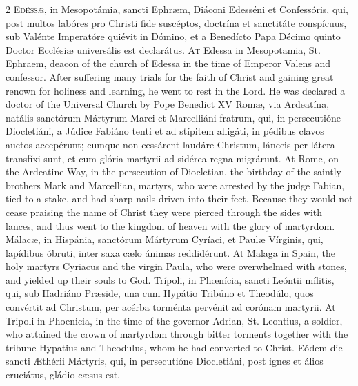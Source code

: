 \begin{paracol}{2}
\lettrine[lines=2]{E}{déssæ,} in Mesopotámia, sancti Ephræm, Diáconi Edesséni et Confessóris, qui, post multos labóres pro 
 Christi fide suscéptos, doctrína et sanctitáte conspícuus, sub Valénte 
 Imperatóre quiévit in Dómino, et a Benedícto Papa Décimo quinto Doctor 
 Ecclésiæ universális est declarátus.
\switchcolumn
{}
\lettrine[lines=2]{A}{t} Edessa in Mesopotamia, St. 
 Ephraem, deacon of the church of Edessa in the time of Emperor Valens and 
 confessor. After suffering many trials for the faith of Christ and 
 gaining great renown for holiness and learning, he went to rest in the Lord. 
 He was declared a doctor of the Universal Church by Pope Benedict XV
\switchcolumn*
{}
Romæ, via Ardeatína, 
 natális sanctórum Mártyrum Marci et Marcelliáni fratrum, qui, in 
 persecutióne Diocletiáni, a Júdice Fabiáno tenti et ad stípitem alligáti, in 
 pédibus clavos auctos accepérunt; cumque non cessárent laudáre Christum, 
 lánceis per látera transfíxi sunt, et cum glória martyrii ad sidérea regna 
 migrárunt.
\switchcolumn
{}
At Rome, on the Ardeatine Way, in 
 the persecution of Diocletian, the birthday of the saintly brothers Mark and 
 Marcellian, martyrs, who were arrested by the judge Fabian, tied to a stake, 
 and had sharp nails driven into their feet. Because they would not 
 cease praising the name of Christ they were pierced through the sides with 
 lances, and thus went to the kingdom of heaven with the glory of martyrdom.
\switchcolumn*
{}
Málacæ, in Hispánia, 
 sanctórum Mártyrum Cyríaci, et Paulæ Vírginis, qui, lapídibus óbruti, inter 
 saxa cælo ánimas reddidérunt.
\switchcolumn
{}
At Malaga in Spain, the holy martyrs 
 Cyriacus and the virgin Paula, who were overwhelmed with stones, and yielded 
 up their souls to God.
\switchcolumn*
{}
Trípoli, in Phœnícia, 
 sancti Leóntii mílitis, qui, sub Hadriáno Præside, una cum Hypátio Tribúno 
 et Theodúlo, quos convértit ad Christum, per acérba torménta pervénit ad 
 corónam martyrii.
\switchcolumn
{}
At Tripoli in Phoenicia, in the time 
 of the governor Adrian, St. Leontius, a soldier, who attained the crown of 
 martyrdom through bitter torments together with the tribune Hypatius and 
 Theodulus, whom he had converted to Christ.
\switchcolumn*
{}
Eódem die sancti 
 Æthérii Mártyris, qui, in persecutióne Diocletiáni, post ignes et álios 
 cruciátus, gládio cæsus est.

\end{paracol}

